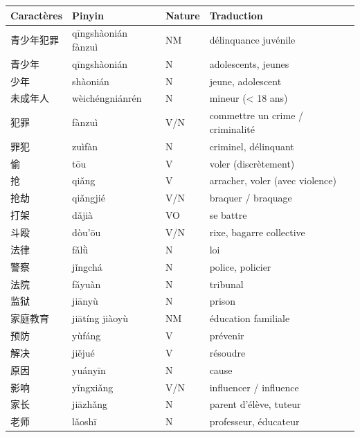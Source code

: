 \documentclass[11pt]{article}
\begin{document}
\begin{center}
\begin{tabularx}{\linewidth}{|X|X|X|X|}
\hline
\rowcolor{popblueL} Caractères & Pinyin & Nature & Traduction \\
\hline
青少年犯罪 & qīngshàonián fànzuì & NM & délinquance juvénile \\
青少年 & qīngshàonián & N & adolescents, jeunes \\
少年 & shàonián & N & jeune, adolescent \\
未成年人 & wèichéngniánrén & N & mineur (< 18 ans) \\
犯罪 & fànzuì & V/N & commettre un crime / criminalité \\
罪犯 & zuìfàn & N & criminel, délinquant \\
偷 & tōu & V & voler (discrètement) \\
抢 & qiǎng & V & arracher, voler (avec violence) \\
抢劫 & qiǎngjié & V/N & braquer / braquage \\
打架 & dǎjià & VO & se battre \\
斗殴 & dòu'ōu & V/N & rixe, bagarre collective \\
法律 & fǎlǜ & N & loi \\
警察 & jǐngchá & N & police, policier \\
法院 & fǎyuàn & N & tribunal \\
监狱 & jiānyù & N & prison \\
家庭教育 & jiātíng jiàoyù & NM & éducation familiale \\
预防 & yùfáng & V & prévenir \\
解决 & jiějué & V & résoudre \\
原因 & yuányīn & N & cause \\
影响 & yǐngxiǎng & V/N & influencer / influence \\
家长 & jiāzhǎng & N & parent d'élève, tuteur \\
老师 & lǎoshī & N & professeur, éducateur \\
\hline
\end{tabularx}
\end{center}
\end{document}
